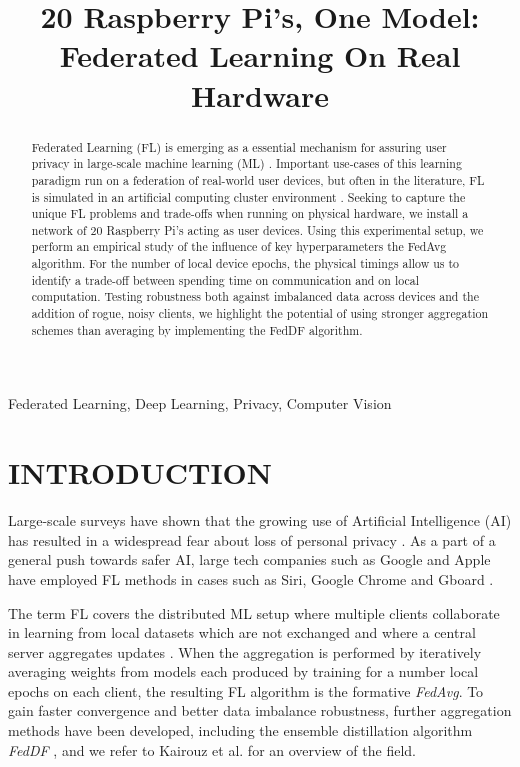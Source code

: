 \documentclass{article}
\title{20 Raspberry Pi's, One Model: Federated Learning On Real Hardware}
\begin{document}
%

\maketitle
%
\begin{abstract}
    Federated Learning (FL) is emerging as a essential mechanism for assuring user privacy in large-scale machine learning (ML) \cite{kai2021advances}.
    Important use-cases of this learning paradigm run on a federation of real-world user devices, but often in the literature, FL is simulated in an artificial computing cluster environment \cite{kai2021advances,mcmahan2017communication,lin2020ensemble}.
    Seeking to capture the unique FL problems and trade-offs when running on physical hardware, we install a network of 20 Raspberry Pi's acting as user devices.
    Using this experimental setup, we perform an empirical study of the influence of key hyperparameters the FedAvg \cite{mcmahan2017communication} algorithm.
    For the number of local device epochs, the physical timings allow us to identify a trade-off between spending time on communication and on local computation.
    Testing robustness both against imbalanced data across devices and the addition of rogue, noisy clients, we highlight the potential of using stronger aggregation schemes than averaging by implementing the FedDF \cite{lin2020ensemble} algorithm.
\end{abstract}
%
\begin{keywords}
    Federated Learning, Deep Learning, Privacy, Computer Vision
\end{keywords}


\section{INTRODUCTION}
\label{sec:intro}
Large-scale surveys have shown that the growing use of Artificial Intelligence (AI) has resulted in a widespread fear about loss of personal privacy \cite{beuc2020consumers, west2018survey}.
As a part of a general push towards safer AI, large tech companies such as Google and Apple have employed FL methods in cases such as Siri, Google Chrome and Gboard \cite{kai2021advances}.

The term FL covers the distributed ML setup where multiple clients collaborate in learning from local datasets which are not exchanged and where a central server aggregates updates \cite{kai2021advances, mcmahan2017communication}.
When the aggregation is performed by iteratively averaging weights from models each produced by training for a number local epochs on each client, the resulting FL algorithm is the formative \emph{FedAvg}\cite{mcmahan2017communication}.
To gain faster convergence and better data imbalance robustness, further aggregation methods have been developed, including the ensemble distillation algorithm \emph{FedDF} \cite{lin2020ensemble}, and we refer to Kairouz et al. for an overview of the field\cite{kai2021advances}.
\end{document}
